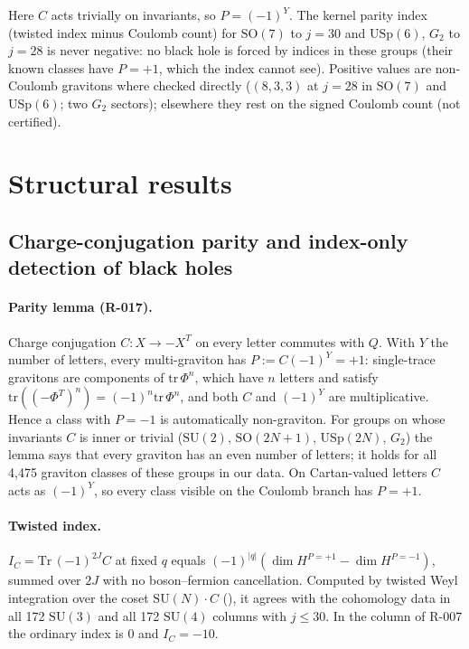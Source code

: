 \documentclass[11pt]{article}
\newcommand{\file}[1]{\path{#1}}
\newcommand{\R}[1]{\textsf{R-0#1}}
\newcommand{\SU}{\mathrm{SU}}
\newcommand{\SO}{\mathrm{SO}}
\newcommand{\USp}{\mathrm{USp}}
\newcommand{\Gtwo}{G_2}
\begin{document}
Here $C$ acts trivially on invariants, so $P=(-1)^Y$. The kernel parity index (twisted index minus Coulomb count) for
$\SO(7)$ to $j=30$ and $\USp(6)$, $\Gtwo$ to $j=28$ is never negative: no black hole is forced by indices in these
groups (their known classes have $P=+1$, which the index cannot see). Positive values are non-Coulomb gravitons where
checked directly ($(8,3,3)$ at $j=28$ in $\SO(7)$ and $\USp(6)$; two $\Gtwo$ sectors); elsewhere they rest on the
signed Coulomb count (not certified).

\section{Structural results}\label{sec:structure}

\subsection{Charge-conjugation parity and index-only detection of black holes}\label{sec:parity}

\paragraph{Parity lemma (\R{17}).} Charge conjugation $C:X\to-X^T$ on every letter commutes with $Q$. With $Y$ the
number of letters, every multi-graviton has $P:=C(-1)^Y=+1$: single-trace gravitons are components of
$\mathrm{tr}\,\Phi^n$, which have $n$ letters and satisfy $\mathrm{tr}((-\Phi^T)^n)=(-1)^n\mathrm{tr}\,\Phi^n$, and both
$C$ and $(-1)^Y$ are multiplicative. Hence a class with $P=-1$ is automatically non-graviton. For groups on whose
invariants $C$ is inner or trivial ($\SU(2)$, $\SO(2N+1)$, $\USp(2N)$, $\Gtwo$) the lemma says that every graviton has
an even number of letters; it holds for all 4{,}475 graviton classes of these groups in our data. On Cartan-valued
letters $C$ acts as $(-1)^Y$, so every class visible on the Coulomb branch has $P=+1$.

\paragraph{Twisted index.} $I_C=\mathrm{Tr}\,(-1)^{2J}C$ at fixed $q$ equals $(-1)^{|q|}(\dim H^{P=+1}-\dim H^{P=-1})$,
summed over $2J$ with no boson--fermion cancellation. Computed by twisted Weyl integration over the coset
$\SU(N)\cdot C$ (\file{code/fortuity/bmn/twistedindex.py}), it agrees with the cohomology data in all 172 $\SU(3)$
and all 172 $\SU(4)$ columns with $j\le30$. In the column of R-007 the ordinary index is $0$ and $I_C=-10$.
\end{document}
